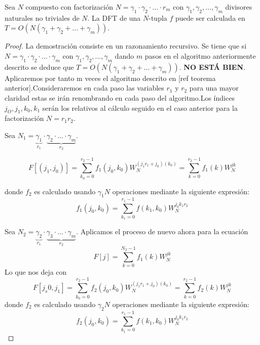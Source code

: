 \begin{teorema}
Sea $N$ compuesto con factorización $N = \gamma_1 \cdot \gamma_2 \cdot \ldots \cdot r_m$ con $\gamma_1, \gamma_2, \ldots, \gamma_m$ divisores naturales no triviales de $N$.
La DFT de una $N$-tupla $f$ puede ser calculada en $T = O(N(\gamma_1 + \gamma_2 + \ldots + \gamma_m))$.
\end{teorema}

\begin{proof}

La demostración consiste en un razonamiento recursivo. Se tiene que si $N = \gamma_1 \cdot \gamma_2 \cdot \ldots \cdot \gamma_m$ con $\gamma_1, \gamma_2, \ldots, \gamma_m$ dando $m$ pasos en el algoritmo anteriormente descrito se deduce que  $T=O(N(\gamma_1 + \gamma_2 + \ldots + \gamma_m))$.
\textbf{NO ESTÁ BIEN}.
Aplicaremos por tanto m veces el algoritmo descrito en [ref teorema anterior].Consideraremos en cada paso las variables $r_1$ y $r_2$ para una mayor claridad estas se irán renombrando en cada paso del algoritmo.Los índices $j_O,j_1,k_0,k_1$ serán los relativos al cálculo seguido en el caso anterior para la  factorización $N= r_1r_2$.

\vspace{0.1cm}

Sea  $ N_1 =  \underbrace{\gamma_1}_{r_1} \cdot \underbrace{\gamma_2 \cdot \ldots \cdot \gamma_m}_{r_2}$.

\begin{equation}
    F[(j_1,j_0)] = \sum_{k_0=0}^{r_2-1}  f_1(j_0,k_0)W_N^{(j_1r_1+j_0)(k_0)} = \sum_{k=0}^{r_2-1}  f_1(k)W_N^{jk} 
\end{equation}

donde $f_2$ es calculado usando $\gamma_1N$ operaciones mediante la siguiente expresión:
\begin{equation}
    f_1(j_0,k_0) = \sum_{k_1=0}^{r_1-1} f(k_1,k_0) W_N^{j_0k_1r_2}
\end{equation}
\vspace{0.1cm}
 
\vspace{0.1cm}

Sea $N_2 = \underbrace{\gamma_2}_{r_1} \cdot \underbrace{ \gamma_3 \cdot \ldots \cdot \gamma_m}_{r_2}$.
Aplicamos el proceso de nuevo ahora para la ecuación 
\begin{equation}\label{eq:fft2}
    F[j] = \sum_{k=0}^{N_2-1}  f_1(k)W_N^{jk}  
\end{equation}
Lo que nos deja con 
\begin{equation}\label{eq:fft2}
      F[j_s0,j_1]  = \sum_{k_0=0}^{r_2-1}  f_2(j_0,k_0)W_N^{(j_1r_1+j_0)(k_0)} = \sum_{k=0}^{r_2-1}  f_2(k)W_N^{jk} 
\end{equation}
donde $f_2$ es calculado usando $\gamma_2N$ operaciones mediante la siguiente expresión:
\begin{equation}\label{eq:fft1}
    f_2(j_0,k_0) = \sum_{k_1=0}^{r_1-1} f(k_1,k_0) W_N^{j_0k_1r_2}
\end{equation}



\end{proof}
